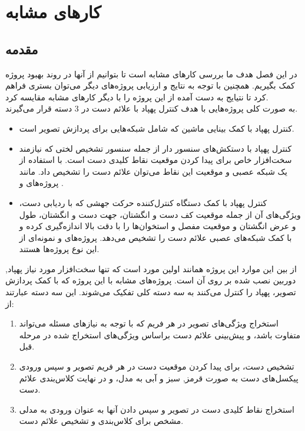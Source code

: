 \chapter{کار‌های مشابه}
\section{مقدمه}
در این فصل هدف ما بررسی کارهای مشابه است تا بتوانیم از آنها در روند بهبود پروژه کمک بگیریم. همچنین با توجه به نتایج و ارزیابی پروژه‌های دیگر می‌توان بستری فراهم کرد تا نتیایج به دست آمده از این پروژه را با دیگر کارهای مشابه مقایسه کرد.
\\
به صورت کلی پروژه‌هایی با هدف کنترل پهپاد با علائم دست در 3 دسته قرار می‌گیرند.
\begin{itemize}
    \item کنترل پهپاد با کمک بینایی ماشین که شامل شبکه‌هایی برای پردازش تصویر است. 
    \item کنترل پهپاد با دستکش‌های سنسور دار از جمله سنسور تشخیص لختی
      که نیازمند سخت‌افزار خاص برای پیدا کردن موقعیت نقاط کلیدی دست است. با استفاده از یک شبکه عصبی و موقعیت این نقاط می‌توان علائم دست را تشخیص داد. مانند پروژه‌های  \cite{yoo2022motion} و \cite{ma2017hand}.
    \item  کنترل پهپاد با کمک دستگاه کنترل‌کننده حرکت جهشی که با ردیابی دست، ویژگی‌های آن از جمله موقعیت کف دست و انگشتان، جهت دست و انگشتان، طول و عرض انگشتان و موقعیت مفصل و استخوان‌ها را با دقت بالا اندازه‌گیری کرده و با کمک شبکه‌های عصبی علائم دست را تشخیص می‌دهد. پروژه‌های
    \cite{hu2020deep} و \cite{sarkar2016gesture} نمونه‌ای از این نوع پروژه‌ها هستند. 
\end{itemize}

از بین این موارد این پروژه همانند اولین مورد است که تنها سخت‌افزار مورد نیاز پهپاد, دوربین نصب شده بر روی آن است. 
پروژه‌های مشابه با این پروژه که با کمک پردازش تصویر، پهپاد را کنترل می‌‌کنند به سه دسته کلی تفکیک می‌شوند.
این سه دسته عبارتند از:
\begin{enumerate}
    \item استخراج ویژگی‌های تصویر در هر فریم که با توجه به نیاز‌های مسئله می‌تواند متفاوت باشد، و پیش‌بینی علائم دست براساس ویژگی‌های استخراج شده در مرحله قبل.
    \item تشخیص دست، ‌برای پیدا کردن موقعیت دست در هر فریم تصویر و سپس ورودی پیکسل‌های دست به صورت قرمز, سبز و آبی
    به مدل، و در نهایت کلاس‌بندی علائم دست.
    \item استخراج نقاط کلیدی  دست در تصویر و سپس دادن آنها به عنوان ورودی به مدلی مشخص برای کلاس‌بندی و تشخیص علائم دست.
\end{enumerate}

